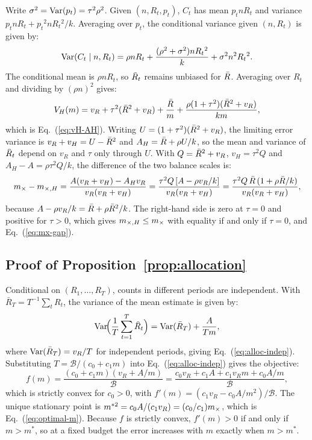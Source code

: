 Write $\sigma^2=\mathrm{Var}(p_t)=\tau^2\rho^2$. Given $(n,R_t,p_t)$, $C_t$ has mean $p_tnR_t$ and variance $p_tnR_t+p_t{}^2nR_t{}^2/k$. Averaging over $p_t$, the conditional variance given $(n,R_t)$ is given by:
\begin{equation}
  \mathrm{Var}(C_t\mid n,R_t)=\rho nR_t+\frac{(\rho^2+\sigma^2)nR_t{}^2}{k}+\sigma^2n^2R_t{}^2.
\end{equation}
The conditional mean is $\rho nR_t$, so $\Rhat_t$ remains unbiased for $\bar{R}$. Averaging over $R_t$ and dividing by $(\rho n)^2$ gives:
\begin{equation}
  V_H(m)=v_R+\tau^2(\bar{R}^2+v_R)+\frac{\bar{R}}{m}+\frac{\rho(1+\tau^2)(\bar{R}^2+v_R)}{km},
\end{equation}
which is Eq.~(\ref{eq:vH-AH}). Writing $U=(1+\tau^2)(\bar{R}{}^2+v_R)$, the limiting error variance is $v_R+v_H=U-\bar{R}{}^2$ and $A_H=\bar{R}+\rho U/k$, so the mean and variance of $\Rhat_t$ depend on $v_R$ and $\tau$ only through $U$. With $Q=\bar{R}^2+v_R$, $v_H=\tau^2Q$ and $A_H-A=\rho\tau^2Q/k$, the difference of the two balance scales is:
\begin{equation}
  m_{\times}-m_{\times,H}=\frac{A(v_R+v_H)-A_Hv_R}{v_R(v_R+v_H)}=\frac{\tau^2Q\left[A-\rho v_R/k\right]}{v_R(v_R+v_H)}=\frac{\tau^2Q\,\bar{R}\,(1+\rho\bar{R}/k)}{v_R(v_R+v_H)},
\end{equation}
because $A-\rho v_R/k=\bar{R}+\rho\bar{R}^2/k$. The right-hand side is zero at $\tau=0$ and positive for $\tau>0$, which gives $m_{\times,H}\le m_{\times}$ with equality if and only if $\tau=0$, and Eq.~(\ref{eq:mx-gap}).

\subsection{Proof of Proposition~\ref{prop:allocation}}
\label{app:prop3}

Conditional on $(R_1,\dots,R_T)$, counts in different periods are independent. With $\bar{R}_T=T^{-1}\sum_tR_t$, the variance of the mean estimate is given by:
\begin{equation}
  \Var\!\Big(\frac{1}{T}\sum_{t=1}^T\Rhat_t\Big)=\Var(\bar{R}_T)+\frac{A}{Tm},
\end{equation}
where $\mathrm{Var}(\bar{R}_T)=v_R/T$ for independent periods, giving Eq.~(\ref{eq:alloc-indep}). Substituting $T=\mathcal{B}/(c_0+c_1m)$ into Eq.~(\ref{eq:alloc-indep}) gives the objective:
\begin{equation}
  f(m)=\frac{(c_0+c_1m)(v_R+A/m)}{\mathcal{B}}=\frac{c_0v_R+c_1A+c_1v_Rm+c_0A/m}{\mathcal{B}},
\end{equation}
which is strictly convex for $c_0>0$, with $f'(m)=(c_1v_R-c_0A/m^2)/\mathcal{B}$. The unique stationary point is $m^{*2}=c_0A/(c_1v_R)=(c_0/c_1)m_{\times}$, which is Eq.~(\ref{eq:optimal-m}). Because $f$ is strictly convex, $f'(m)>0$ if and only if $m>m^*$, so at a fixed budget the error increases with $m$ exactly when $m>m^*$.

